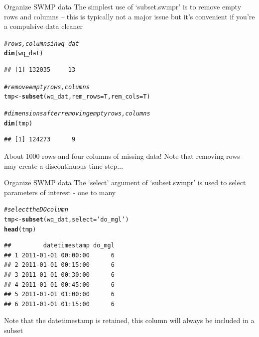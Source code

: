 \documentclass[xcolor=svgnames]{beamer}\usepackage[]{graphicx}\usepackage[]{color}
\makeatletter
\newcommand{\hlstr}[1]{\textcolor[rgb]{0.192,0.494,0.8}{#1}}%
\newcommand{\hlcom}[1]{\textcolor[rgb]{0.678,0.584,0.686}{\textit{#1}}}%
\newcommand{\hlstd}[1]{\textcolor[rgb]{0.345,0.345,0.345}{#1}}%
\newcommand{\hlkwb}[1]{\textcolor[rgb]{0.69,0.353,0.396}{#1}}%
\newcommand{\hlkwc}[1]{\textcolor[rgb]{0.333,0.667,0.333}{#1}}%
\newcommand{\hlkwd}[1]{\textcolor[rgb]{0.737,0.353,0.396}{\textbf{#1}}}%
\newenvironment{kframe}{%
 \def\at@end@of@kframe{}%
 \ifinner\ifhmode%
  \def\at@end@of@kframe{\end{minipage}}%
  \begin{minipage}{\columnwidth}%
 \fi\fi%
 \def\FrameCommand##1{\hskip\@totalleftmargin \hskip-\fboxsep
 \colorbox{shadecolor}{##1}\hskip-\fboxsep
     \hskip-\linewidth \hskip-\@totalleftmargin \hskip\columnwidth}%
 \MakeFramed {\advance\hsize-\width
   \@totalleftmargin\z@ \linewidth\hsize
   \@setminipage}}%
 {\par\unskip\endMakeFramed%
 \at@end@of@kframe}
\newenvironment{knitrout}{}{} %
\makeatother
\begin{document}
\begin{frame}[containsverbatim]{Organize SWMP data}
The simplest use of `subset.swmpr' is to remove empty rows and columns -- this is typically not a major issue but it's convenient if you're a compulsive data cleaner
\begin{knitrout}\scriptsize
{}\color{fgcolor}\begin{kframe}
\begin{alltt}
\hlcom{# rows, columns in wq_dat}
\hlkwd{dim}\hlstd{(wq_dat)}
\end{alltt}
\begin{verbatim}
## [1] 132035     13
\end{verbatim}
\begin{alltt}
\hlcom{# remove empty rows, columns}
\hlstd{tmp} \hlkwb{<-} \hlkwd{subset}\hlstd{(wq_dat,} \hlkwc{rem_rows} \hlstd{= T,} \hlkwc{rem_cols} \hlstd{= T)}

\hlcom{# dimensions after removing empty rows, columns}
\hlkwd{dim}\hlstd{(tmp)}
\end{alltt}
\begin{verbatim}
## [1] 124273      9
\end{verbatim}
\end{kframe}
\end{knitrout}
About 1000 rows and four columns of missing data!  Note that removing rows may create a discontinuous time step...
\end{frame}

\begin{frame}[containsverbatim]{Organize SWMP data}
The `select' argument of `subset.swmpr' is used to select parameters of interest - one to many
\begin{knitrout}\scriptsize
{}\color{fgcolor}\begin{kframe}
\begin{alltt}
\hlcom{# select the DO column}
\hlstd{tmp} \hlkwb{<-} \hlkwd{subset}\hlstd{(wq_dat,} \hlkwc{select} \hlstd{=} \hlstr{'do_mgl'}\hlstd{)}
\hlkwd{head}\hlstd{(tmp)}
\end{alltt}
\begin{verbatim}
##         datetimestamp do_mgl
## 1 2011-01-01 00:00:00      6
## 2 2011-01-01 00:15:00      6
## 3 2011-01-01 00:30:00      6
## 4 2011-01-01 00:45:00      6
## 5 2011-01-01 01:00:00      6
## 6 2011-01-01 01:15:00      6
\end{verbatim}
\end{kframe}
\end{knitrout}
Note that the datetimestamp is retained, this column will always be included in a subset
\end{frame}
\end{document}
